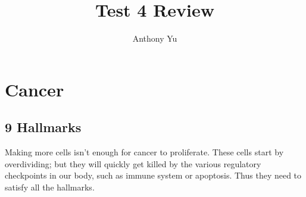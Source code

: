 \documentclass[12pt]{article}
\title{Test 4 Review}
\author{Anthony Yu}
\begin{document}
\newcommand{\problem}[1]{\subsection*{Problem {#1}}}
\newenvironment{enumAlph}{\begin{enumerate}[label=(\alph*)]}{\end{enumerate}}

\makeatletter
\newcommand{\skipitems}[1]{%
\addtocounter{\@enumctr}{#1}%
}
\makeatother

\newcommand{\chunit}[3]{\qty{#1}{{#2}\,\ce{#3}}}
\newcommand{\chuniteval}[3]{\qty[evaluate-expression]{#1}{{#2}\,\ce{#3}}}

\newtheorem{definition}{Definition}

\maketitle

\section{Cancer}
\subsection{9 Hallmarks}
Making more cells isn't enough for cancer to proliferate. 
These cells start by overdividing; but they will quickly
get killed by the various regulatory checkpoints in our body,
such as immune system or apoptosis. Thus they need to satisfy
all the hallmarks. 
\end{document}
